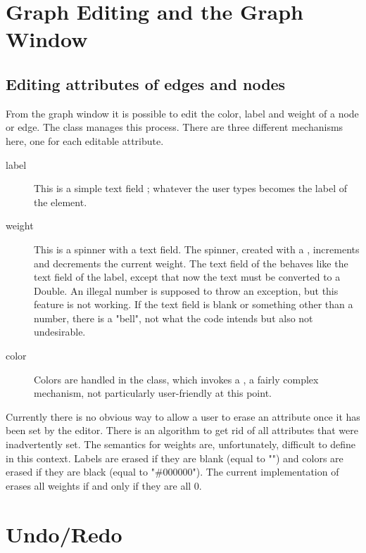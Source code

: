 \section{Graph Editing and the Graph Window} \label{sec:graph_window}

\subsection{Editing attributes of edges and nodes}

From the graph window it is possible to edit the color, label and weight of a
node or edge.
The  class manages this process. There are three
different mechanisms here, one for each editable attribute.
\begin{description}
\item[label] This is a simple text field ; whatever the user
  types becomes the label of the element.
\item[weight] This is a spinner with a text field. The spinner, created with
  a , increments and decrements the current
  weight. The text field of the  behaves like the text field of
  the label, except that now the text must be converted to a Double.
  An illegal number is supposed to throw an exception, but this feature is
  not working. If the text field is blank or something other than a number,
  there is a "bell", not what the code intends but also not undesirable.
\item[color] Colors are handled in the  class, which invokes
  a , a fairly complex mechanism, not particularly
  user-friendly at this point.
\end{description}
Currently there is no obvious way to allow a user to erase an attribute once
it has been set by the editor. There is an algorithm 
to get rid of all attributes that were inadvertently set. The semantics for
weights are, unfortunately, difficult to define in this context. Labels are
erased if they are blank (equal to "") and colors are erased if they are black
(equal to "\#000000"). The current implementation of 
erases all weights if and only if they are all 0.

\section{Undo/Redo} \label{sec:undo}

